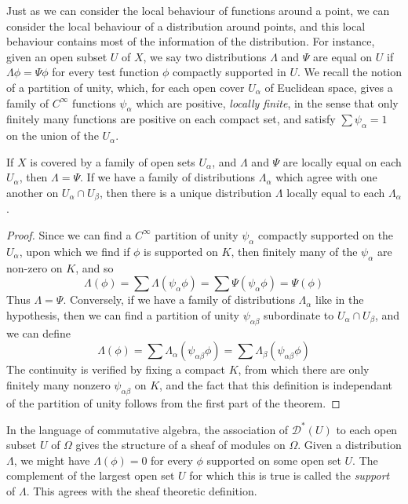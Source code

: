 Just as we can consider the local behaviour of functions around a point, we can consider the local behaviour of a distribution around points, and this local behaviour contains most of the information of the distribution. For instance, given an open subset $U$ of $X$, we say two distributions $\Lambda$ and $\Psi$ are equal on $U$ if $\Lambda \phi = \Psi \phi$ for every test function $\phi$ compactly supported in $U$. We recall the notion of a partition of unity, which, for each open cover $U_\alpha$ of Euclidean space, gives a family of $C^\infty$ functions $\psi_\alpha$ which are positive, {\it locally finite}, in the sense that only finitely many functions are positive on each compact set, and satisfy $\sum \psi_\alpha = 1$ on the union of the $U_\alpha$.

\begin{theorem}
    If $X$ is covered by a family of open sets $U_\alpha$, and $\Lambda$ and $\Psi$ are locally equal on each $U_\alpha$, then $\Lambda = \Psi$. If we have a family of distributions $\Lambda_\alpha$ which agree with one another on $U_\alpha \cap U_\beta$, then there is a unique distribution $\Lambda$ locally equal to each $\Lambda_\alpha$.
\end{theorem}
\begin{proof}
    Since we can find a $C^\infty$ partition of unity $\psi_\alpha$ compactly supported on the $U_\alpha$, upon which we find if $\phi$ is supported on $K$, then finitely many of the $\psi_\alpha$ are non-zero on $K$, and so
    \[ \Lambda(\phi) = \sum \Lambda(\psi_\alpha \phi) = \sum \Psi(\psi_\alpha \phi) = \Psi(\phi) \]
    Thus $\Lambda = \Psi$. Conversely, if we have a family of distributions $\Lambda_\alpha$ like in the hypothesis, then we can find a partition of unity $\psi_{\alpha \beta}$ subordinate to $U_\alpha \cap U_\beta$, and we can define
    \[ \Lambda(\phi) = \sum \Lambda_\alpha(\psi_{\alpha \beta} \phi) = \sum \Lambda_\beta(\psi_{\alpha \beta} \phi) \]
    The continuity is verified by fixing a compact $K$, from which there are only finitely many nonzero $\psi_{\alpha \beta}$ on $K$, and the fact that this definition is independant of the partition of unity follows from the first part of the theorem.
\end{proof}

In the language of commutative algebra, the association of $\mathcal{D}^*(U)$ to each open subset $U$ of $\Omega$ gives the structure of a sheaf of modules on $\Omega$. Given a distribution $\Lambda$, we might have $\Lambda(\phi) = 0$ for every $\phi$ supported on some open set $U$. The complement of the largest open set $U$ for which this is true is called the \emph{support} of $\Lambda$. This agrees with the sheaf theoretic definition.

